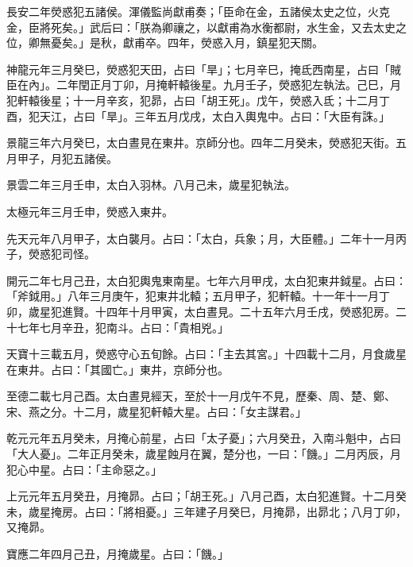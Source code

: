 \begin{pinyinscope}
 長安二年熒惑犯五諸侯。渾儀監尚獻甫奏；「臣命在金，五諸侯太史之位，火克金，臣將死矣。」武后曰：「朕為卿禳之，以獻甫為水衡都尉，水生金，又去太史之位，卿無憂矣。」是秋，獻甫卒。四年，熒惑入月，鎮星犯天關。



 神龍元年三月癸巳，熒惑犯天田，占曰「旱」；七月辛巳，掩氐西南星，占曰「賊臣在內」。二年閏正月丁卯，月掩軒轅後星。九月壬子，熒惑犯左執法。己巳，月犯軒轅後星；十一月辛亥，犯昴，占曰「胡王死」。戊午，熒惑入氐；十二月丁酉，犯天江，占曰「旱」。三年五月戊戌，太白入輿鬼中。占曰：「大臣有誅。」



 景龍三年六月癸巳，太白晝見在東井。京師分也。四年二月癸未，熒惑犯天街。五月甲子，月犯五諸侯。



 景雲二年三月壬申，太白入羽林。八月己未，歲星犯執法。



 太極元年三月壬申，熒惑入東井。



 先天元年八月甲子，太白襲月。占曰：「太白，兵象；月，大臣體。」二年十一月丙子，熒惑犯司怪。



 開元二年七月己丑，太白犯輿鬼東南星。七年六月甲戌，太白犯東井鉞星。占曰：「斧鉞用。」八年三月庚午，犯東井北轅；五月甲子，犯軒轅。十一年十一月丁卯，歲星犯進賢。十四年十月甲寅，太白晝見。二十五年六月壬戌，熒惑犯房。二十七年七月辛丑，犯南斗。占曰：「貴相兇。」



 天寶十三載五月，熒惑守心五旬餘。占曰：「主去其宮。」十四載十二月，月食歲星在東井。占曰：「其國亡。」東井，京師分也。



 至德二載七月己酉。太白晝見經天，至於十一月戊午不見，歷秦、周、楚、鄭、宋、燕之分。十二月，歲星犯軒轅大星。占曰：「女主謀君。」



 乾元元年五月癸未，月掩心前星，占曰「太子憂」；六月癸丑，入南斗魁中，占曰「大人憂」。二年正月癸未，歲星蝕月在翼，楚分也，一曰：「饑。」二月丙辰，月犯心中星。占曰：「主命惡之。」



 上元元年五月癸丑，月掩昴。占曰；「胡王死。」八月己酉，太白犯進賢。十二月癸未，歲星掩房。占曰：「將相憂。」三年建子月癸巳，月掩昴，出昴北；八月丁卯，又掩昴。



 寶應二年四月己丑，月掩歲星。占曰：「饑。」




\end{pinyinscope}
